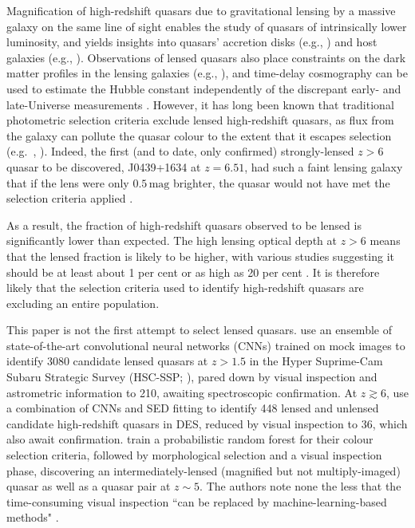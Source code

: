 \documentclass[fleqn,usenatbib]{mnras}
\begin{document}
Magnification of high-redshift quasars due to gravitational lensing by a massive galaxy on the same line of sight enables the study of quasars of intrinsically lower luminosity, and yields insights into quasars' accretion disks (e.g., \citealt{chan21}) and host galaxies (e.g., \citealt{stacey18}).
Observations of lensed quasars also place constraints on the dark matter profiles in the lensing galaxies (e.g., \citealt{gilman20}), and time-delay cosmography can be used to estimate the Hubble constant independently of the discrepant early- and late-Universe measurements \citep{refsdal64, treu22}.
However, it has long been known that traditional photometric selection criteria exclude lensed high-redshift quasars, as flux from the galaxy can pollute the quasar colour to the extent that it escapes selection (e.g.\ \citealt{wyithe02}, \citealt{pacucci19}).
Indeed, the first (and to date, only confirmed) strongly-lensed $z>6$ quasar to be discovered, J0439+1634 at $z=6.51$, had such a faint lensing galaxy that if the lens were only $0.5\,\text{mag}$ brighter, the quasar would not have met the selection criteria applied \citep{fan19}.

As a result, the fraction of high-redshift quasars observed to be lensed is significantly lower than expected.
The high lensing optical depth at $z>6$ means that the lensed fraction is likely to be higher, with various studies suggesting it should be at least about 1 per cent \citep{yue22} or as high as 20 per cent \citep{pacucci19}.
It is therefore likely that the selection criteria used to identify high-redshift quasars are excluding an entire population.

This paper is not the first attempt to select lensed quasars. \citet{andikaensemble} use an ensemble of state-of-the-art convolutional neural networks (CNNs) trained on mock images to identify 3080 candidate lensed quasars at $z>1.5$ in the Hyper Suprime-Cam Subaru Strategic Survey (HSC-SSP; \citealt{hscssp}), pared down by visual inspection and astrometric information to 210, awaiting spectroscopic confirmation.
At $z\gtrsim6$, \citet{andika23} use a combination of CNNs and SED fitting to identify 448 lensed and unlensed candidate high-redshift quasars in DES, reduced by visual inspection to 36, which also await confirmation.
\citet{yue23} train a probabilistic random forest for their colour selection criteria, followed by morphological selection and a visual inspection phase, discovering an intermediately-lensed (magnified but not multiply-imaged) quasar as well as a quasar pair at $z\sim 5$.
The authors note none the less that the time-consuming visual inspection ``can be replaced by machine-learning-based methods" \citep{yue23}.
\end{document}
